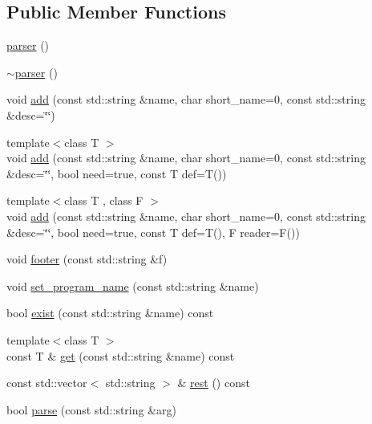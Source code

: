 \subsection*{Public Member Functions}
\begin{DoxyCompactItemize}
\item 
\mbox{\hyperlink{classcmdline_1_1parser_a436c7cba6efd596729d18d58f1016cad}{parser}} ()
\item 
\mbox{\hyperlink{classcmdline_1_1parser_ad656d8b9b4a38ce85cd2b630c4fc9a6d}{$\sim$parser}} ()
\item 
void \mbox{\hyperlink{classcmdline_1_1parser_a122aab1fb389f16170397971be1e75b6}{add}} (const std\+::string \&name, char short\+\_\+name=0, const std\+::string \&desc=\char`\"{}\char`\"{})
\item 
{\footnotesize template$<$class T $>$ }\\void \mbox{\hyperlink{classcmdline_1_1parser_af97ab18f409599df07146da819c96bae}{add}} (const std\+::string \&name, char short\+\_\+name=0, const std\+::string \&desc=\char`\"{}\char`\"{}, bool need=true, const T def=T())
\item 
{\footnotesize template$<$class T , class F $>$ }\\void \mbox{\hyperlink{classcmdline_1_1parser_aa6d002a3ef165c240d65c1e87f61a77c}{add}} (const std\+::string \&name, char short\+\_\+name=0, const std\+::string \&desc=\char`\"{}\char`\"{}, bool need=true, const T def=T(), F reader=F())
\item 
void \mbox{\hyperlink{classcmdline_1_1parser_a00f22e1d9ac1b8d73dfc990b4f87a598}{footer}} (const std\+::string \&f)
\item 
void \mbox{\hyperlink{classcmdline_1_1parser_afdf4cb8deaead2d735c7803ede5b6b6a}{set\+\_\+program\+\_\+name}} (const std\+::string \&name)
\item 
bool \mbox{\hyperlink{classcmdline_1_1parser_abe6c9ad7c3991062076917de0514376c}{exist}} (const std\+::string \&name) const
\item 
{\footnotesize template$<$class T $>$ }\\const T \& \mbox{\hyperlink{classcmdline_1_1parser_a81a73f9940d4a04a17cf894289f2ad9e}{get}} (const std\+::string \&name) const
\item 
const std\+::vector$<$ std\+::string $>$ \& \mbox{\hyperlink{classcmdline_1_1parser_a691375f291a8013f70e1c402f90c3531}{rest}} () const
\item 
bool \mbox{\hyperlink{classcmdline_1_1parser_ab8ca75cca3abf36b9474edcf0ce21ca6}{parse}} (const std\+::string \&arg)

\end{DoxyCompactItemize}
